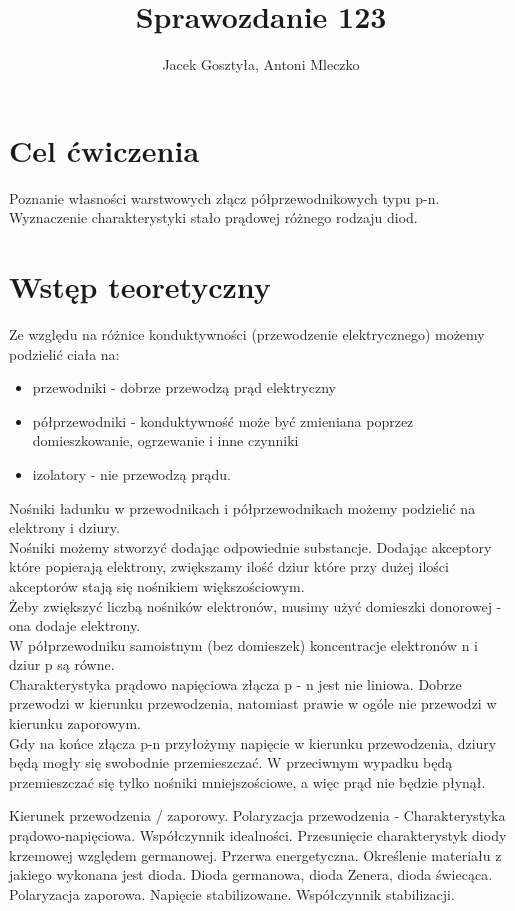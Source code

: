\documentclass[11pt]{article}
\begin{document}
\title{Sprawozdanie 123}
\author{Jacek Gosztyła, Antoni Mleczko}
\maketitle
\section{Cel ćwiczenia} 
Poznanie własności warstwowych złącz półprzewodnikowych typu p-n. Wyznaczenie charakterystyki stało prądowej różnego rodzaju diod. 
\section{Wstęp teoretyczny}
Ze względu na różnice konduktywności (przewodzenie elektrycznego) możemy podzielić ciała na: 
\begin{itemize}
\item przewodniki - dobrze przewodzą prąd elektryczny
\item półprzewodniki - konduktywność może być zmieniana poprzez domieszkowanie, ogrzewanie i inne czynniki
\item izolatory - nie przewodzą prądu. 
\end{itemize}

Nośniki ładunku w przewodnikach i półprzewodnikach możemy podzielić na elektrony i dziury. \\
Nośniki możemy stworzyć dodając odpowiednie substancje. Dodając akceptory które popierają elektrony, zwiększamy ilość dziur które przy dużej ilości akceptorów stają się nośnikiem większościowym. \\
Żeby zwiększyć liczbą nośników elektronów, musimy użyć  domieszki donorowej - ona dodaje elektrony. \\
W półprzewodniku samoistnym (bez domieszek) koncentracje elektronów n i dziur p są równe. \\
Charakterystyka prądowo napięciowa złącza p - n jest nie liniowa. Dobrze przewodzi w kierunku przewodzenia, natomiast prawie w ogóle nie przewodzi w  kierunku zaporowym.  \\ 
Gdy na końce złącza p-n przyłożymy napięcie w kierunku przewodzenia, dziury będą mogły się swobodnie przemieszczać. W przeciwnym wypadku będą przemieszczać się tylko nośniki mniejszościowe, a więc prąd nie będzie płynął. 



Kierunek przewodzenia / zaporowy.
Polaryzacja przewodzenia - 
Charakterystyka prądowo-napięciowa. 
Współczynnik idealności.
Przesunięcie charakterystyk diody krzemowej względem germanowej. 
Przerwa energetyczna. 
Określenie materiału z jakiego wykonana jest dioda. 
Dioda germanowa, dioda Zenera, dioda świecąca. 
Polaryzacja zaporowa. 
Napięcie stabilizowane.
Współczynnik stabilizacji. 
\end{document}
